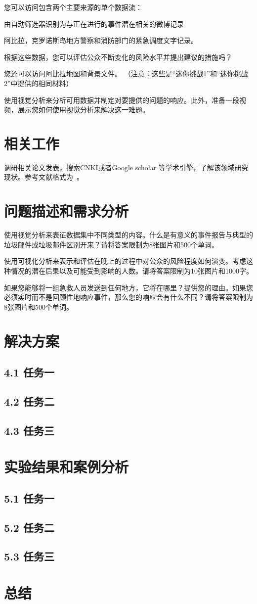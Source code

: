 \documentclass[a4paper]{article}
\begin{document}
您可以访问包含两个主要来源的单个数据流：

由自动筛选器识别为与正在进行的事件潜在相关的微博记录

阿比拉，克罗诺斯岛地方警察和消防部门的紧急调度文字记录。

根据这些数据，您可以评估公众不断变化的风险水平并提出建议的措施吗？

您还可以访问阿比拉地图和背景文件。 （注意：这些是“迷你挑战1”和“迷你挑战2”中提供的相同材料）

使用视觉分析来分析可用数据并制定对要提供的问题的响应。此外，准备一段视频，展示您如何使用视觉分析来解决这一难题。

\section{相关工作}

调研相关论文发表，搜索CNKI或者Google scholar 等学术引擎，了解该领域研究现状。参考文献格式为~\cite{bayrak2020pragma}。

\section{问题描述和需求分析}
\label{Data and Task Abstraction}
使用视觉分析来表征数据集中不同类型的内容。什么是有意义的事件报告与典型的垃圾邮件或垃圾邮件区别开来？请将答案限制为8张图片和500个单词。

使用可视化分析来表示和评估在晚上的过程中对公众的风险程度如何演变。考虑这种情况的潜在后果以及可能受到影响的人数。请将答案限制为10张图片和1000字。

如果您能够将一组急救人员发送到任何地方，它将在哪里？提供您的理由。如果您必须实时而不是回顾性地响应事件，那么您的响应会有什么不同？请将答案限制为8张图片和500个单词。

\section{解决方案}
\subsection*{ 4.1 任务一}
\subsection*{ 4.2 任务二}
\subsection*{ 4.3 任务三}

\section{实验结果和案例分析}\label{sub:ptxeva}
\subsection*{ 5.1 任务一}
\subsection*{ 5.2 任务二}
\subsection*{ 5.3 任务三}
\section{总结}



\end{document}
